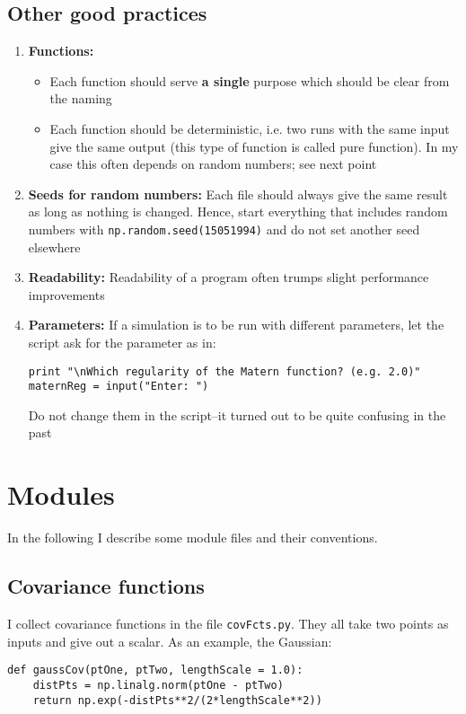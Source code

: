 \documentclass[11pt]{article}
\begin{document}
\subsection{Other good practices}
\begin{enumerate}
\item \textbf{Functions:}
\begin{itemize}
\item Each function should serve \textbf{a single} purpose which should be clear from the naming
\item Each function should be deterministic, i.e. two runs with the same input give the same output (this type of function is called pure function). In my case this often depends on random numbers; see next point
\end{itemize}
\item \textbf{Seeds for random numbers:} Each file should always give the same result as long as nothing is changed. Hence, start everything that includes random numbers with \texttt{np.random.seed(15051994)} and do not set another seed elsewhere
\item \textbf{Readability:} Readability of a program often trumps slight performance improvements
\item \textbf{Parameters:} If a simulation is to be run with different parameters, let the script ask for the parameter as in:
\begin{Verbatim}[formatcom=\color{blue!50!black}]
print "\nWhich regularity of the Matern function? (e.g. 2.0)"
maternReg = input("Enter: ")
\end{Verbatim}
Do not change them in the script--it turned out to be quite confusing in the past
\end{enumerate}

\section{Modules}

In the following I describe some module files and their conventions.



\subsection{Covariance functions}
	\label{subsec:covFcts}
I collect covariance functions in the file \texttt{covFcts.py}. They all take two points as inputs and give out a scalar. As an example, the Gaussian:
\begin{Verbatim}[formatcom=\color{blue!50!black}]
def gaussCov(ptOne, ptTwo, lengthScale = 1.0):
    distPts = np.linalg.norm(ptOne - ptTwo)
    return np.exp(-distPts**2/(2*lengthScale**2))
\end{Verbatim}
\end{document}
